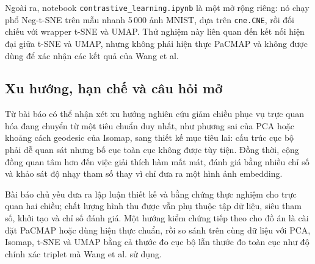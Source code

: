 Ngoài ra, notebook \texttt{contrastive\_learning.ipynb} là một mở rộng
riêng: nó chạy phổ Neg-t-SNE trên mẫu nhanh 5\,000 ảnh MNIST, dựa trên
\texttt{cne.CNE}, rồi đối chiếu với wrapper t-SNE và UMAP. Thử nghiệm này
liên quan đến kết nối hiện đại giữa t-SNE và UMAP, nhưng không phải hiện
thực PaCMAP và không được dùng để xác nhận các kết quả của Wang et al.

\subsection{Xu hướng, hạn chế và câu hỏi mở}

Từ bài báo có thể nhận xét xu hướng nghiên cứu giảm chiều phục vụ trực
quan hóa đang chuyển từ một tiêu chuẩn duy nhất, như phương sai của PCA
hoặc khoảng cách geodesic của Isomap, sang thiết kế mục tiêu lai: cấu trúc
cục bộ phải dễ quan sát nhưng bố cục toàn cục không được tùy tiện. Đồng
thời, cộng đồng quan tâm hơn đến việc giải thích hàm mất mát, đánh giá bằng
nhiều chỉ số và khảo sát độ nhạy tham số thay vì chỉ đưa ra một hình ảnh
embedding.

Bài báo chủ yếu đưa ra lập luận thiết kế và bằng chứng thực nghiệm cho
trực quan hai chiều; chất lượng hình thu được vẫn phụ thuộc tập dữ liệu,
siêu tham số, khởi tạo và chỉ số đánh giá. Một hướng kiểm chứng tiếp theo
cho đồ án là cài đặt PaCMAP hoặc dùng hiện thực chuẩn, rồi so sánh trên
cùng dữ liệu với PCA, Isomap, t-SNE và UMAP bằng cả thước đo cục bộ lẫn
thước đo toàn cục như độ chính xác triplet mà Wang et al. sử dụng.
